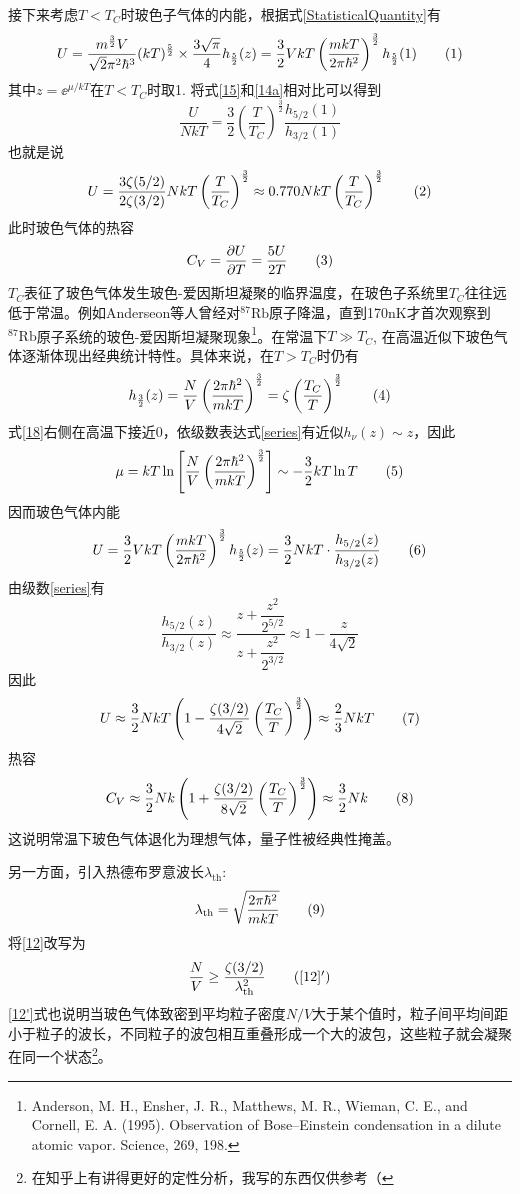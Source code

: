 \documentclass[draft]{article}
\begin{document}
	接下来考虑$ T<T_C $时玻色子气体的内能，根据式\eqref{StatisticalQuantity}有
	\[\label{15}U=\frac{m^{\frac 32}V}{\sqrt{2}\pi^2\hbar^3}(kT)^{\frac 52}\times \frac{3\sqrt{\pi}}{4}h_{\frac 52}(z)=\frac 32VkT\left(\frac{mkT}{2\pi\hbar^2}\right)^{\frac 32}h_{\frac 52}(1)\taghere\]
	其中$ z=\ee^{\mu/kT} $在$ T<T_C $时取1. 将式\eqref{15}和\eqref{14a}相对比可以得到
	\[\frac{U}{NkT}=\frac 32\left(\frac{T}{T_C}\right)^{\frac 32}\frac{h_{5/2}(1)}{h_{3/2}(1)}\]
	也就是说
	\[U=\frac{3\zeta(5/2)}{2\zeta(3/2)}NkT\left(\frac{T}{T_C}\right)^{\frac 32}\approx0.770NkT\left(\frac{T}{T_C}\right)^{\frac 32}\taghere\]
	此时玻色气体的热容
	\[C_V=\parDer UT=\frac{5U}{2T}\taghere\]
	$ T_C $表征了玻色气体发生玻色-爱因斯坦凝聚的临界温度，在玻色子系统里$ T_C $往往远低于常温。例如Anderseon等人曾经对$ ^{87}\text{Rb} $原子降温，直到170nK才首次观察到$ ^{87}\text{Rb} $原子系统的玻色-爱因斯坦凝聚现象\footnote{Anderson, M. H., Ensher, J. R., Matthews, M. R., Wieman, C. E., and Cornell, E. A. (1995). Observation of Bose–Einstein condensation in a dilute atomic vapor. Science, 269, 198.}。在常温下$ T\gg T_C $, 在高温近似下玻色气体逐渐体现出经典统计特性。具体来说，在$ T>T_C $时仍有
	\[\label{18}h_{\frac 32}(z)=\frac NV\left(\frac{2\pi\hbar^2}{mkT}\right)^{\frac 32}=\zeta\left(\frac{T_C}{T}\right)^{\frac 32}\taghere\]
	式\eqref{18}右侧在高温下接近0，依级数表达式\eqref{series}有近似$ h_{\nu}(z)\sim z $，因此
	\[\mu=kT\ln\left[\frac NV\left(\frac{2\pi\hbar^2}{mkT}\right)^{\frac 32}\right]\sim-\frac 32kT\ln T\taghere\]
	因而玻色气体内能
	\[U=\frac 32VkT\left(\frac{mkT}{2\pi\hbar^2}\right)^{\frac 32}h_{\frac 52}(z)=\frac 32NkT\cdot \frac{h_{5/2}(z)}{h_{3/2}(z)}\taghere\]
	由级数\eqref{series}有
	\[\frac{h_{5/2}(z)}{h_{3/2}(z)}\approx\frac{z+\dfrac{z^2}{2^{5/2}}}{z+\dfrac{z^2}{2^{3/2}}}\approx1-\frac{z}{4\sqrt{2}}\]
	因此
	\[U\approx\frac 32NkT\left(1-\frac{\zeta(3/2)}{4\sqrt{2}}\left(\frac{T_C}{T}\right)^{\frac 32}\right)\approx\frac 23NkT\taghere\]
	热容
	\[C_V\approx\frac 32Nk\left(1+\frac{\zeta(3/2)}{8\sqrt{2}}\left(\frac{T_C}{T}\right)^{\frac 32}\right)\approx\frac 32Nk\taghere\]
	这说明常温下玻色气体退化为理想气体，量子性被经典性掩盖。
	
	另一方面，引入热德布罗意波长$ \lambda_{\text{th}} $:
	\[\lambda_{\text{th}}=\sqrt{\frac{2\pi\hbar^2}{mkT}}\taghere\]
	将\eqref{12}改写为
	\[\label{12'}\frac NV\ge\frac{\zeta(3/2)}{\lambda_{\text{th}}^2}\tag{\ref{12}$ ' $}\]
	\eqref{12'}式也说明当玻色气体致密到平均粒子密度$ N/V $大于某个值时，粒子间平均间距小于粒子的波长，不同粒子的波包相互重叠形成一个大的波包，这些粒子就会凝聚在同一个状态\footnote{在知乎上有讲得更好的定性分析，我写的东西仅供参考（}。
\end{document}
